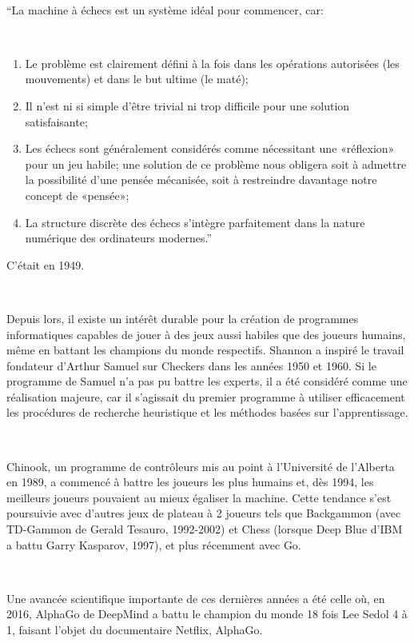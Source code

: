 ~\par
“La machine à échecs est un système idéal pour commencer, car: 

~\par
\begin{enumerate}
\item Le problème est clairement défini à la fois dans les opérations autorisées (les mouvements) et dans le but ultime (le maté); 
\item Il n'est ni si simple d'être trivial ni trop difficile pour une solution satisfaisante; 
\item Les échecs sont généralement considérés comme nécessitant une «réflexion» pour un jeu habile; une solution de ce problème nous obligera soit à admettre la possibilité d'une pensée mécanisée, soit à restreindre davantage notre concept de «pensée»; 
\item La structure discrète des échecs s’intègre parfaitement dans la nature numérique des ordinateurs modernes.”

\end{enumerate}

C'était en 1949.

~\par
Depuis lors, il existe un intérêt durable pour la création de programmes informatiques capables de jouer à des jeux aussi habiles que des joueurs humains, même en battant les champions du monde respectifs. Shannon a inspiré le travail fondateur d’Arthur Samuel sur Checkers dans les années 1950 et 1960. Si le programme de Samuel n’a pas pu battre les experts, il a été considéré comme une réalisation majeure, car il s’agissait du premier programme à utiliser efficacement les procédures de recherche heuristique et les méthodes basées sur l’apprentissage. \parencite{unity1}


~\par
Chinook, un programme de contrôleurs mis au point à l’Université de l’Alberta en 1989, a commencé à battre les joueurs les plus humains et, dès 1994, les meilleurs joueurs pouvaient au mieux égaliser la machine. Cette tendance s’est poursuivie avec d’autres jeux de plateau à 2 joueurs tels que Backgammon (avec TD-Gammon de Gerald Tesauro, 1992-2002) et Chess (lorsque Deep Blue d’IBM a battu Garry Kasparov, 1997), et plus récemment avec Go.

~\par
Une avancée scientifique importante de ces dernières années a été celle où, en 2016, AlphaGo de DeepMind a battu le champion du monde 18 fois Lee Sedol 4 à 1, faisant l’objet du documentaire Netflix, AlphaGo. 


